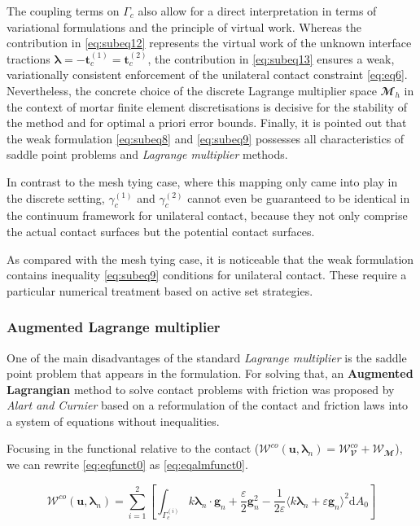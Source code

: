 \documentclass[a4paper,10pt]{article} %
\begin{document}
The coupling terms on $\Gamma_c$ also allow for a direct interpretation in terms of variational formulations and the principle of virtual work. Whereas the contribution in \eqref{eq:subeq12} represents the virtual work of the unknown interface tractions $\boldsymbol{\lambda} = −\mathbf{t}_c^{(1)} = \mathbf{t}_c^{(2)}$, the contribution in \eqref{eq:subeq13} ensures a weak, variationally consistent enforcement of the unilateral contact constraint \eqref{eq:eq6}. Nevertheless, the concrete choice of the discrete Lagrange multiplier space $\mathbfcal{M}_h$ in the context of mortar finite element discretisations is decisive for the stability of the method and for optimal a priori error bounds. Finally, it is pointed out that the weak formulation \eqref{eq:subeq8} and \eqref{eq:subeq9} possesses all characteristics of saddle point problems and \textit{Lagrange multiplier} methods.

In contrast to the mesh tying case, where this mapping only came into play in the discrete setting, $\gamma_c^{(1)}$ and $\gamma_c^{(2)}$ cannot even be guaranteed to be identical in the continuum framework for unilateral contact, because they not only comprise the actual contact surfaces but the potential contact surfaces. 

As compared with the mesh tying case, it is noticeable that the weak formulation contains inequality \eqref{eq:subeq9} conditions for unilateral contact. These require a particular numerical treatment based on active set strategies.

\subsubsection{Augmented Lagrange multiplier}

One of the main disadvantages of the standard \textit{Lagrange multiplier} is the saddle point problem that appears in the formulation. For solving that, an \textbf{Augmented Lagrangian} method to solve contact problems with friction was proposed by \textit{Alart and Curnier}\cite{alart} based on a reformulation of the contact and friction laws into a system
of equations without inequalities. 

Focusing in the functional relative to the contact ($\mathcal{W}^{co}(\mathbf{u},\boldsymbol{\lambda}_n) = \mathcal{W}^{co}_\mathbfcal{V} + \mathcal{W}_\mathbfcal{M}$), we can rewrite \eqref{eq:eqfunct0} as \eqref{eq:eqalmfunct0}.

\begin{equation}\label{eq:eqalmfunct0}
 \mathcal{W}^{co}(\mathbf{u},\boldsymbol{\lambda}_n) = \sum_{i = 1}^2 \left[\int_{\Gamma_c^{(i)}} k \boldsymbol{\lambda}_n \cdot \mathbf{g}_n  + \frac{\varepsilon}{2} \mathbf{g}_n^2 - \frac{1}{2\varepsilon} \langle k \boldsymbol{\lambda}_n + \varepsilon \mathbf{g}_n \rangle^2\text{d}A_0\right]
\end{equation}
\end{document}
